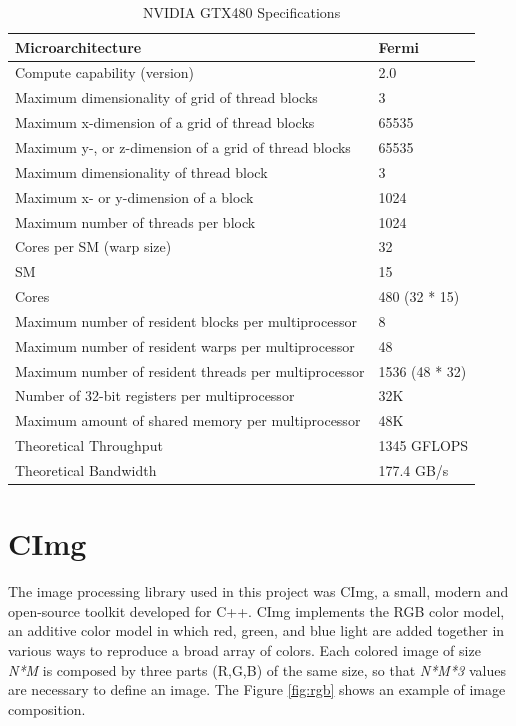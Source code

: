 \documentclass[a4paper]{article}
\begin{document}
\begin{table}[!ht]
\centering
\begin{tabular}{l|l}
Microarchitecture & Fermi \\ \hline
Compute capability (version) & 2.0 \\ \hline
Maximum dimensionality of grid of thread blocks & 3 \\ \hline
Maximum x-dimension of a grid of thread blocks & 65535 \\ \hline
Maximum y-, or z-dimension of a grid of thread blocks & 65535 \\ \hline
Maximum dimensionality of thread block & 3 \\ \hline
Maximum x- or y-dimension of a block & 1024 \\ \hline
Maximum number of threads per block & 1024 \\ \hline
Cores per SM (warp size) & 32 \\ \hline
SM & 15 \\ \hline
Cores & 480 (32 * 15) \\ \hline
Maximum number of resident blocks per multiprocessor & 8 \\ \hline
Maximum number of resident warps per multiprocessor & 48 \\ \hline
Maximum number of resident threads per multiprocessor & 1536 (48 * 32) \\ \hline
Number of 32-bit registers per multiprocessor & 32K \\ \hline
Maximum amount of shared memory per multiprocessor & 48K \\ \hline
Theoretical Throughput & 1345 GFLOPS \\ \hline
Theoretical Bandwidth & 177.4 GB/s
\end{tabular}
\caption{NVIDIA GTX480 Specifications}
\label{table:t1}
\end{table}

\section{CImg}
\label{sec:cimg}
The image processing library used in this project was CImg, a small, modern and open-source toolkit developed for C++. CImg implements the RGB color model, an additive color model in which red, green, and blue light are added together in various ways to reproduce a broad array of colors. Each colored image of size \textit{N*M} is composed by three parts (R,G,B) of the same size, so that \textit{N*M*3} values are necessary to define an image. The Figure \ref{fig:rgb} shows an example of image composition.
\end{document}
